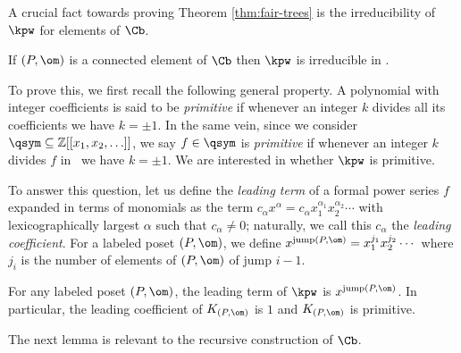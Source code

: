 A crucial fact towards proving Theorem \ref{thm:fair-trees} is the irreducibility 
of $\kpw$ for elements of $\Cb$. 

\begin{proposition}\label{prop:irred-C}
If $(P,\om)$ is a connected element of $\Cb$ then $\kpw$ is irreducible in \qsym.
\end{proposition}

To prove this, we first recall the following general property.  A polynomial with integer coefficients is said to be \emph{primitive} if 
whenever an integer $k$ divides all its coefficients we have $k=\pm1$.
In the same vein, since we consider $\qsym \subseteq \mathbb{Z}[[x_1, x_2, \ldots]]$, we say $f \in \qsym$ is \emph{primitive} if whenever an integer $k$ divides $f$ in \qsym\ we have $k = \pm1$.
We are interested in whether $\kpw$ is primitive.  

To answer this question, let us define the \emph{leading term} of a formal power series $f$ expanded in terms of monomials as the term $c_\alpha x^\alpha = c_\alpha x_1^{\alpha_1} x_2^{\alpha_2} \cdots$ with lexicographically largest $\alpha$ such that $c_\alpha \neq 0$; naturally, we call this $c_\alpha$ the \emph{leading coefficient}.  For a labeled poset $(P,\om)$, we define $x^{\mathrm{jump}(P,\om)} = x_1^{j_1} x_2^{j_2} \cdots$ where $j_i$ is the number of elements of $(P,\om)$ of jump $i-1$.

\begin{proposition}\label{prop:prim}
For any labeled poset $(P,\om)$, the leading term of $\kpw$ is $x^{\mathrm{jump}(P,\om)}$.  In particular, the leading coefficient of $K_{(P, \om)}$ is $1$ and $K_{(P, \om)}$ is primitive.
\end{proposition}

The next lemma is relevant to the recursive construction of $\Cb$.

